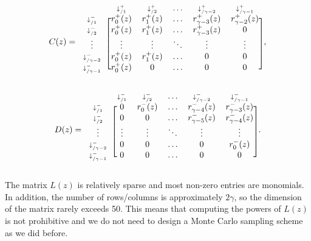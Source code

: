 \documentclass{article}
\begin{document}
\begin{equation*}
C(z) = 
\begin{blockarray}{cccccc}
   & \scriptstyle{\downarrow_{/1}^+} & \scriptstyle{\downarrow_{/2}^+} &
    \ldots & \scriptstyle{\downarrow_{/\gamma-2}^+} &
    \scriptstyle{\downarrow_{/\gamma-1}^+} \\
\begin{block}{c[ccccc]}
\scriptstyle{\downarrow_{/1}^-} & r_0^+(z) & r_1^+(z) & \ldots &
    r_{\gamma-3}^+(z) & r_{\gamma-2}^+(z) \\
\scriptstyle{\downarrow_{/2}^-} & r_0^+(z) & r_1^+(z) & \ldots &
    r_{\gamma-3}^+(z) & 0 \\
\vdots & \vdots & \vdots & \ddots & \vdots & \vdots \\
\scriptstyle{\downarrow_{/\gamma-2}^-} & r_0^+(z) & r_1^+(z) & \ldots &
    0 & 0 \\
\scriptstyle{\downarrow_{/\gamma-1}^-} & r_0^+(z) & 0 & \ldots & 0 & 0 \\
\end{block}
\end{blockarray},
\end{equation*}

\begin{equation*}
D(z) = 
\begin{blockarray}{cccccc}
   & \scriptstyle{\downarrow_{/1}^-} & \scriptstyle{\downarrow_{/2}^-} &
    \ldots & \scriptstyle{\downarrow_{/\gamma-2}^-} &
    \scriptstyle{\downarrow_{/\gamma-1}^-} \\
\begin{block}{c[ccccc]}
\scriptstyle{\downarrow_{/1}^-} & 0 & r_0^-(z) & \ldots &
    r_{\gamma-4}^-(z) & r_{\gamma-3}^-(z) \\
\scriptstyle{\downarrow_{/2}^-} & 0 & 0 & \ldots &
    r_{\gamma-5}^-(z) & r_{\gamma-4}^-(z) \\
\vdots & \vdots & \vdots & \ddots & \vdots & \vdots \\
\scriptstyle{\downarrow_{/\gamma-2}^-} & 0 & 0 & \ldots & 0 & r_0^-(z) \\
\scriptstyle{\downarrow_{/\gamma-1}^-} & 0 & 0 & \ldots & 0 & 0 \\
\end{block}
\end{blockarray}.
\end{equation*}

The matrix $L(z)$ is relatively sparse and most non-zero entries are
monomials. In addition, the number of rows/columns is approximately
$2\gamma$, so the dimension of the matrix rarely exceeds 50. This means
that computing the powers of $L(z)$ is not prohibitive and we do not need
to design a Monte Carlo sampling scheme as we did before.
\end{document}
